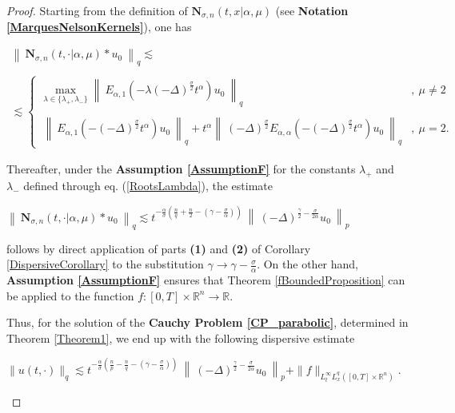 \documentclass{amsart}
\theoremstyle{definition}
\theoremstyle{remark}
\numberwithin{equation}{section}
\newcommand{\BR}{{\mathbb R}}
\begin{document}
		\begin{proof}
			Starting from the definition of ${\bm N}_{\sigma,n}(t,x|\alpha,\mu)$ (see {\bf Notation \ref{MarquesNelsonKernels}}), one has
			
			\begin{eqnarray*}
				\left\|~\displaystyle {\bm N}_{\sigma,n}(t,\cdot|\alpha,\mu)\ast u_0~\right \|_q \lesssim \\ \ \\
				\lesssim \begin{cases}
					\displaystyle 	 \max_{\lambda \in \{\lambda_+,\lambda_-\}} \left\|~E_{\alpha,1}\left(-\lambda(-\Delta)^{\frac{\sigma}{2}} t^\alpha\right)u_0~\right\|_q  &,~\mu\neq 2 \\ \ \\
					\displaystyle ~\left\|~E_{\alpha,1}\left(-(-\Delta)^{\frac{\sigma}{2}}t^\alpha\right) u_0~\right\|_q+t^\alpha \left\|~(-\Delta)^{\frac{\sigma}{2}}E_{\alpha,\alpha}\left(-(-\Delta)^{\frac{\sigma}{2}}t^\alpha\right) u_0~\right\|_q &,~\mu= 2.
				\end{cases}
			\end{eqnarray*}	
			
			Thereafter, under the {\bf Assumption \ref{AssumptionF}} for the constants $\lambda_+$ and $\lambda_{-}$ defined through eq. (\ref{RootsLambda}), the estimate
			\begin{center}
				$	\left\|~\displaystyle {\bm N}_{\sigma,n}(t,\cdot|\alpha,\mu)\ast u_0~\right \|_q \lesssim  t^{-\frac{\alpha}{\sigma}\left(\frac{n}{q}+\frac{n}{2}-\left(\gamma-\frac{\sigma}{\alpha}\right)\right)}~ \left\|~(-\Delta)^{\frac{\gamma}{2}-\frac{\sigma}{2\alpha}}u_0~\right\|_{p}$
			\end{center}
			follows by direct application of parts {\bf (1)} and {\bf (2)} of Corollary \ref{DispersiveCorollary} to the substitution $\gamma \rightarrow \gamma-\frac{\sigma}{\alpha}$. On the other hand, {\bf Assumption \ref{AssumptionF}} ensures that Theorem \ref{fBoundedProposition} can be applied to the function $f:[0,T]\times \BR^n\longrightarrow \BR$.
			
			Thus, for the solution of the {\bf Cauchy Problem \ref{CP_parabolic}}, determined in Theorem \ref{Theorem1}, we end up with the following dispersive estimate
			\begin{center}
				$\| u(t,\cdot)\|_q \lesssim t^{-\frac{\alpha}{\sigma}\left(\frac{n}{p}-\frac{n}{q}-\left(\gamma-\frac{\sigma}{\alpha}\right)\right)}~ \left\|~(-\Delta)^{\frac{\gamma}{2}-\frac{\sigma}{2\alpha}}u_0~\right\|_{p}+\|f\|_{L^\infty_tL^q_x([0,T]\times\BR^n)}$.
			\end{center}
			

\end{proof}
\end{document}
